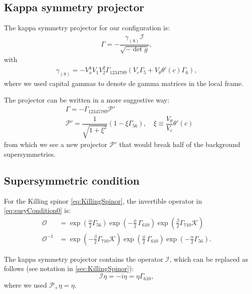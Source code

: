 

\subsection{Kappa symmetry projector}

The kappa symmetry projector for our configuration is:
\begin{align}
\Gamma = - \dfrac{ \gamma_{(8)} \mathcal{I} }{\sqrt{-\det g}},
\end{align}
with
\begin{align}
 \gamma_{(8)} = - V_x^4 V_1 V_2^2 \Gamma_{1 2 3 4 7 8 9}( V_c \Gamma_5 +  V_{\theta} \theta'(c) \Gamma_6), 
\end{align}
where we used capital gammas to denote de gamma matrices in the local frame. 

The projector can be written in a more suggestive way:
\begin{align} \label{eq:kappaProjector}
 & \Gamma = - \Gamma_{1 2 3 4 5 7 8 9} \mathcal{P}'\\
 & \mathcal{P}' = \dfrac{1}{\sqrt{1+\xi^2}}(1-\xi  \Gamma_{56}), \quad 
   \xi \equiv  \dfrac{V_\theta}{V_c} \theta'(c)
\end{align}
from which we see a new projector $\mathcal{P}'$ that would break half of the background supersymmetries.

\subsection{Supersymmetric condition}

For the Killing spinor \eqref{eq:KillingSpinor}, the invertible operator in \eqref{eq:susyCondition0} is:
\begin{align}
 \mathcal{O} &= \exp{\left(\frac{\alpha}{2}\Gamma_{56} \right)} \exp{\left(-\frac{\phi}{2}\, \Gamma_{610} \right)} \exp{\left(\frac{\beta}{2}\Gamma_{710} \mathcal{K} \right)} \\
 \mathcal{O}^{-1} &=  \exp{\left(-\frac{\beta}{2}\Gamma_{710} \mathcal{K} \right)} 
 \exp{\left(\frac{\phi}{2}\, \Gamma_{610} \right)} 
 \exp{\left(-\frac{\alpha}{2}\Gamma_{56} \right)}.
\end{align}


The kappa symmetry projector contains the operator $\mathcal{I}$, which can be replaced as follows (see notation in \ref{sec:KillingSpinor}):
\begin{equation}
 \mathcal{I}\eta =-i \eta =\eta  \Gamma_{610},
\end{equation}
where we used $\mathcal{P}_+ \eta =\eta$. 


